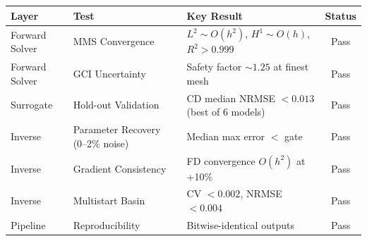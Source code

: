 \begin{tabular}{l l l c}
\toprule
Layer & Test & Key Result & Status \\
\midrule
Forward Solver & MMS Convergence & $L^2 \sim O(h^2)$, $H^1 \sim O(h)$, $R^2 > 0.999$ & Pass \\
Forward Solver & GCI Uncertainty & Safety factor $\sim 1.25$ at finest mesh & Pass \\
Surrogate & Hold-out Validation & CD median NRMSE $< 0.013$ (best of 6 models) & Pass \\
Inverse & Parameter Recovery (0--2\% noise) & Median max error $<$ gate & Pass \\
Inverse & Gradient Consistency & FD convergence $O(h^2)$ at +10\% & Pass \\
Inverse & Multistart Basin & CV $< 0.002$, NRMSE $< 0.004$ & Pass \\
Pipeline & Reproducibility & Bitwise-identical outputs & Pass \\
\bottomrule
\end{tabular}
